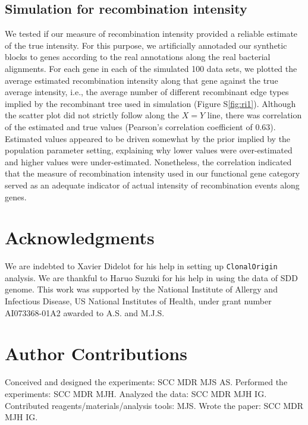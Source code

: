 \documentclass[english]{article}
\begin{document}
\subsection{Simulation for recombination intensity}

We tested if our measure of recombination intensity provided a reliable estimate
of the true intensity. For this purpose, we artificially annotaded our synthetic
blocks to genes according to the real annotations along the real bacterial
alignments. For each gene in each of the simulated 100 data sets, we plotted the
average estimated recombination intensity along that gene against the true
average intensity, i.e., the average number of different recombinant edge types
implied by the recombinant tree used in simulation (Figure S\ref{fig:ri1}).
Although the scatter plot did not strictly follow along the $X=Y$ line, there
was correlation of the estimated and true values (Pearson's correlation
coefficient of 0.63). Estimated values appeared to be driven somewhat by the
prior implied by the population parameter setting, explaining why lower values
were over-estimated and higher values were under-estimated. Nonetheless, the
correlation indicated that the measure of recombination intensity used in our
functional gene category served as an adequate indicator of actual intensity of
recombination events along genes.

\section*{Acknowledgments}

We are indebted to Xavier Didelot for his help in setting up \texttt{ClonalOrigin}
analysis.  We are thankful to Haruo Suzuki for his help
in using the data of SDD genome. This work was supported by the National
Institute of Allergy and Infectious Disease, US National Institutes
of Health, under grant number AI073368-01A2 awarded to A.S. and M.J.S.

\section*{Author Contributions}

Conceived and designed the experiments: SCC MDR MJS AS.
Performed the experiments: SCC MDR MJH.
Analyzed the data: SCC MDR MJH IG.
Contributed reagents/materials/analysis tools: MJS.
Wrote the paper: SCC MDR MJH IG.



\end{document}
